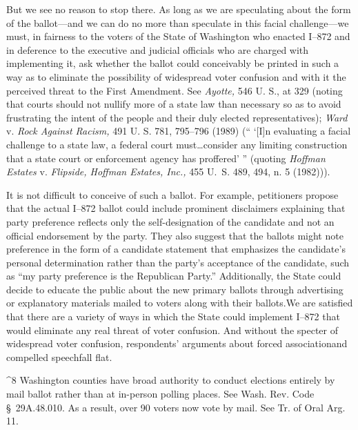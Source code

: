   But we see no reason to stop there. As long as we are speculating
about the form of the ballot---and we can do no \newpage  more than
speculate in this facial challenge---we must, in fairness to the voters
of the State of Washington who enacted I--872 and in deference to the
executive and judicial officials who are charged with implementing it,
ask whether the ballot could conceivably be printed in such a way as to
eliminate the possibility of widespread voter confusion and with it the
perceived threat to the First Amendment. See \emph{Ayotte,} 546 U. S.,
at 329 (noting that courts should not nullify more of a state law than
necessary so as to avoid frustrating the intent of the people and their
duly elected representatives); \emph{Ward} v. \emph{Rock Against Racism,} 491
U. S. 781, 795--796 (1989) (`` ‘[I]n evaluating a facial challenge
to a state law, a federal court must\dots consider any limiting
construction that a state court or enforcement agency has proffered'
'' (quoting \emph{Hoffman Estates} v. \emph{Flipside, Hoffman Estates, Inc.,}
455 U.~S. 489, 494, n. 5 (1982))).

  It is not difficult to conceive of such a ballot. For example,
petitioners propose that the actual I--872 ballot could include
prominent disclaimers explaining that party preference reflects only the
self-designation of the candidate and not an official endorsement by the
party. They also suggest that the ballots might note preference in the
form of a candidate statement that emphasizes the candidate's personal
determination rather than the party's acceptance of the candidate,
such as ``my party preference is the Republican Party.'' Additionally,
the State could decide to educate the public about the new primary
ballots through advertising or explanatory materials mailed to voters
along with their ballots.\footnotemark[8] We are satisfied that there are a variety
of ways in which the State could implement I--872 that would eliminate
any real threat of voter confusion. And without the spec\newpage ter
of widespread voter confusion, respondents' arguments about forced
association\footnotemark[9] and compelled speech\footnotemark[10] fall flat.

^8 Washington counties have broad authority to conduct elections
entirely by mail ballot rather than at in-person polling places. See
Wash. Rev. Code \S~29A.48.010. As a result, over 90%
voters now vote by mail. See Tr. of Oral Arg. 11.


